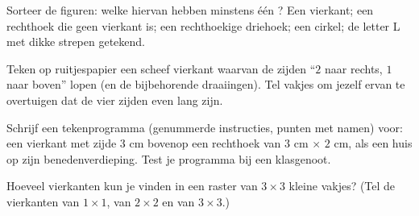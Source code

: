 \begin{exercise}[$\star$]\label{exo:g3:shapes:8}
Sorteer de figuren: welke hiervan hebben minstens één ? Een
vierkant; een rechthoek die geen vierkant is; een rechthoekige driehoek;
een cirkel; de letter L met dikke strepen getekend.
\end{exercise}

\begin{exercise}[$\star\star$]\label{exo:g3:shapes:9}
Teken op ruitjespapier een scheef vierkant waarvan de zijden ``$2$ naar
rechts, $1$ naar boven'' lopen (en de bijbehorende draaiingen). Tel
vakjes om jezelf ervan te overtuigen dat de vier zijden even lang zijn.
\end{exercise}

\begin{exercise}[$\star\star$]\label{exo:g3:shapes:10}
Schrijf een tekenprogramma (genummerde instructies, punten met namen)
voor: een vierkant met zijde $3$ cm bovenop een rechthoek van
$3$ cm $\times$ $2$ cm, als een huis op zijn benedenverdieping. Test je
programma bij een klasgenoot.
\end{exercise}

\begin{exercise}[$\star\star$]\label{exo:g3:shapes:11}
Hoeveel vierkanten kun je vinden in een raster van $3 \times 3$ kleine
vakjes? (Tel de vierkanten van $1 \times 1$, van $2 \times 2$ en van
$3 \times 3$.)
\end{exercise}
